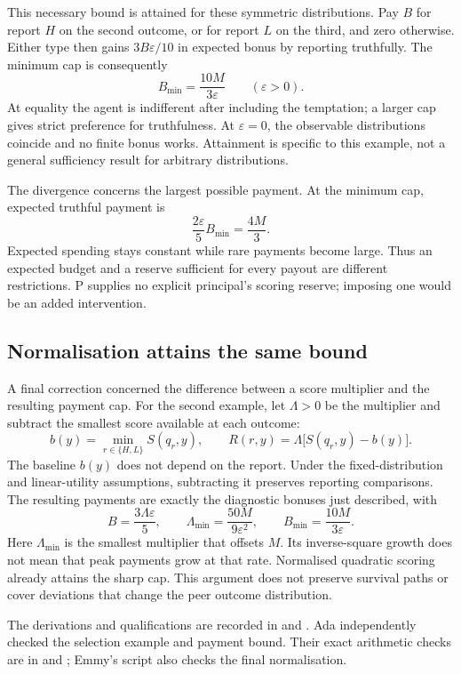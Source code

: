 \documentclass{article}
\begin{document}
This necessary bound is attained for these symmetric distributions.
Pay \(B\) for report \(H\) on the second outcome, or for report \(L\) on the third, and zero otherwise.
Either type then gains \(3B\varepsilon/10\) in expected bonus by reporting truthfully.
The minimum cap is consequently
\[
B_{\min}=\frac{10M}{3\varepsilon}\qquad(\varepsilon>0).
\]
At equality the agent is indifferent after including the temptation; a larger cap gives strict preference for truthfulness.
At \(\varepsilon=0\), the observable distributions coincide and no finite bonus works.
Attainment is specific to this example, not a general sufficiency result for arbitrary distributions.

The divergence concerns the largest possible payment.
At the minimum cap, expected truthful payment is
\[
\frac{2\varepsilon}{5}B_{\min}=\frac{4M}{3}.
\]
Expected spending stays constant while rare payments become large.
Thus an expected budget and a reserve sufficient for every payout are different restrictions.
P supplies no explicit principal's scoring reserve; imposing one would be an added intervention.

\subsection{Normalisation attains the same bound}
A final correction concerned the difference between a score multiplier and the resulting payment cap.
For the second example, let \(\Lambda>0\) be the multiplier and subtract the smallest score available at each outcome:
\[
b(y)=\min_{r\in\{H,L\}}S(q_r,y),\qquad
R(r,y)=\Lambda\bigl[S(q_r,y)-b(y)\bigr].
\]
The baseline \(b(y)\) does not depend on the report.
Under the fixed-distribution and linear-utility assumptions, subtracting it preserves reporting comparisons.
The resulting payments are exactly the diagnostic bonuses just described, with
\[
B=\frac{3\Lambda\varepsilon}{5},\qquad
\Lambda_{\min}=\frac{50M}{9\varepsilon^2},\qquad
B_{\min}=\frac{10M}{3\varepsilon}.
\]
Here \(\Lambda_{\min}\) is the smallest multiplier that offsets \(M\).
Its inverse-square growth does not mean that peak payments grow at that rate.
Normalised quadratic scoring already attains the sharp cap.
This argument does not preserve survival paths or cover deviations that change the peer outcome distribution.

The derivations and qualifications are recorded in
 and .
Ada independently checked the selection example and payment bound.
Their exact arithmetic checks are in  and
; Emmy's script also checks the final normalisation.
\end{document}

